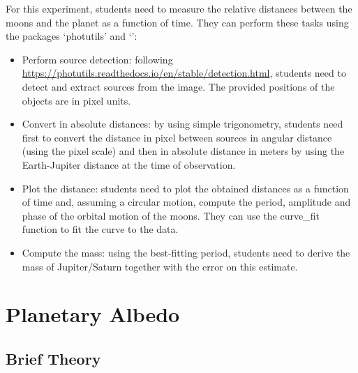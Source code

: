 \documentclass[a4paper, 11pt, fleqn]{memoir}
\begin{document}
For this experiment, students need to measure the relative distances between the moons and the planet as a function of time.
They can perform these tasks using the  packages `photutils' and `':
\begin{itemize}
    \item Perform source detection: following \url{https://photutils.readthedocs.io/en/stable/detection.html}, students need to detect and extract sources from the image.
          The provided positions of the objects are in pixel units.
    \item
          Convert in absolute distances: by using simple trigonometry, students need
          first to convert the distance in pixel between sources in angular distance
          (using the pixel scale) and then in absolute distance in meters by using the
          Earth-Jupiter distance at the time of observation.
    \item
          Plot the distance: students need to plot the obtained distances as a function
          of time and, assuming a circular motion, compute the period, amplitude and
          phase of the orbital motion of the moons.
          They can use the  curve\_fit function to fit the curve to the data.
    \item
          Compute the mass: using the best-fitting period, students need to derive the
          mass of Jupiter/Saturn together with the error on this estimate.
\end{itemize}

\section{Planetary Albedo}

\subsection{Brief Theory}
\label{subsection:albedo_theory}
\end{document}
